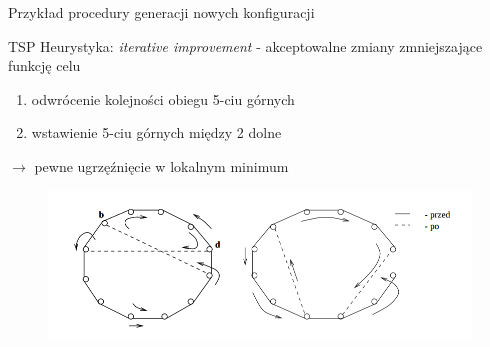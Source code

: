 	\begin{frame}{Przykład procedury generacji nowych konfiguracji}
		\begin{exampleblock}{TSP \cite{lin}}
			Heurystyka: \textit{iterative improvement} - akceptowalne zmiany zmniejszające funkcję celu
			\begin{enumerate}
				\item odwrócenie kolejności obiegu 5-ciu górnych
				\item wstawienie 5-ciu górnych między 2 dolne
			\end{enumerate}
			$\rightarrow$ pewne ugrzęźnięcie w lokalnym minimum
			\begin{figure}
				\includegraphics[height=0.4\textheight]{img/18/tsp}
			\end{figure}
		\end{exampleblock}
	\end{frame}
